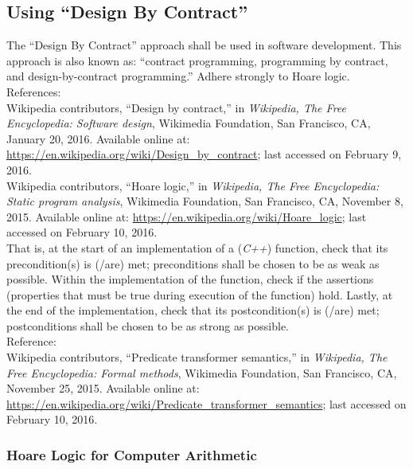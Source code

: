 \subsection{Using ``Design By Contract''}
\label{ssec:UsingDesignByContract}

	The ``Design By Contract'' approach shall be used in software development. This approach is also known as: ``contract programming, programming by contract, and design-by-contract programming.'' Adhere strongly to Hoare logic. \\

References: \\
Wikipedia contributors, ``Design by contract,'' in {\it Wikipedia, The Free Encyclopedia: Software design}, Wikimedia Foundation, San Francisco, CA, January 20, 2016. Available online at: \url{https://en.wikipedia.org/wiki/Design_by_contract}; last accessed on February 9, 2016. \\

Wikipedia contributors, ``Hoare logic,'' in {\it Wikipedia, The Free Encyclopedia: Static program analysis}, Wikimedia Foundation, San Francisco, CA, November 8, 2015. Available online at: \url{https://en.wikipedia.org/wiki/Hoare_logic}; last accessed on February 10, 2016. \\

	That is, at the start of an implementation of a ({\it C++}) function, check that its precondition(s) is (/are) met; preconditions shall be chosen to be as weak as possible. Within the implementation of the function, check if the assertions (properties that must be true during execution of the function) hold. Lastly, at the end of the implementation, check that its postcondition(s) is (/are) met; postconditions shall be chosen to be as strong as possible. \\

Reference: \\
Wikipedia contributors, ``Predicate transformer semantics,'' in {\it Wikipedia, The Free Encyclopedia: Formal methods}, Wikimedia Foundation, San Francisco, CA, November 25, 2015. Available online at: \url{https://en.wikipedia.org/wiki/Predicate_transformer_semantics}; last accessed on February 10, 2016.



\subsubsection{Hoare Logic for Computer Arithmetic}
\label{sssec:HoareLogicForComputerArithmetic}

